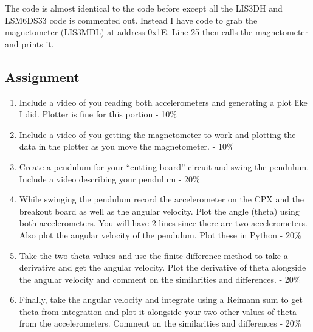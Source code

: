 The code is almost identical to the code before except all the LIS3DH and LSM6DS33 code is commented out. Instead I have code to grab the magnetometer (LIS3MDL) at address 0x1E. Line 25 then calls the magnetometer and prints it. 

\subsection{Assignment}



\begin{enumerate}[itemsep=-5pt]
\item Include a video of you reading both accelerometers and generating a plot like I did. Plotter is fine for this portion - 10\%
\item Include a video of you getting the magnetometer to work and plotting the data in the plotter as you move the magnetometer. - 10\%
\item Create a pendulum for your “cutting board” circuit and swing the pendulum. Include a video describing your pendulum - 20\%
\item While swinging the pendulum record the accelerometer on the CPX and the breakout board as well as the angular velocity. Plot the angle (theta) using both accelerometers. You will have 2 lines since there are two accelerometers. Also plot the angular velocity of the pendulum. Plot these in Python - 20\%
\item Take the two theta values and use the finite difference method to take a derivative and get the angular velocity. Plot the derivative of theta alongside the angular velocity and comment on the similarities and differences. - 20\%
\item Finally, take the angular velocity and integrate using a Reimann sum to get theta from integration and plot it alongside your two other values of theta from the accelerometers. Comment on the similarities and differences - 20\%
\end{enumerate}
